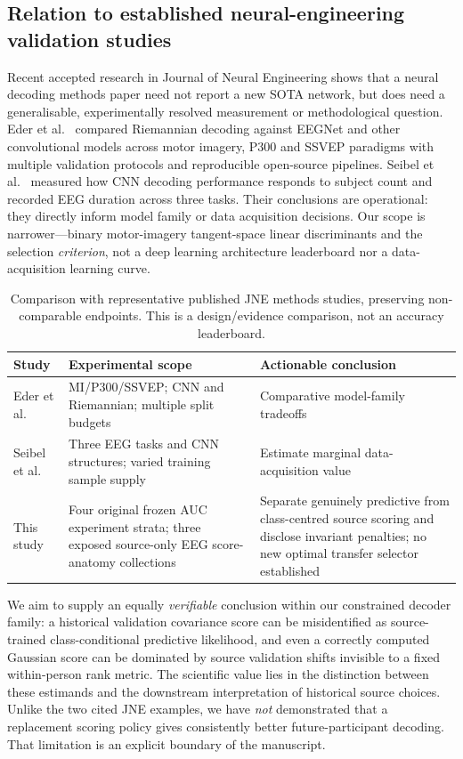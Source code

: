 \subsection{Relation to established neural-engineering validation studies}
\label{sec:p1-jne-peer}
Recent accepted research in Journal of Neural Engineering shows
that a neural decoding methods paper need not report a new SOTA
network, but does need a generalisable, experimentally resolved
measurement or methodological question.
Eder et al.\ \cite{eder2024jnebenchmark} compared Riemannian
decoding against EEGNet and other convolutional models
across motor imagery, P300 and SSVEP paradigms with multiple
validation protocols and reproducible open-source pipelines.
Seibel et al.\ \cite{seibel2026jnedata}
measured how CNN decoding performance responds to subject
count and recorded EEG duration across three tasks.
Their conclusions are operational: they directly inform
model family or data acquisition decisions.
Our scope is narrower---binary motor-imagery
tangent-space linear discriminants and the
selection \emph{criterion}, not a deep learning
architecture leaderboard nor a data-acquisition
learning curve.

\begin{table}[tb]
\centering\small
\caption{Comparison with representative published
JNE methods studies, preserving non-comparable
endpoints. This is a design/evidence comparison,
not an accuracy leaderboard.}
\label{tab:p1-jne-peer}
\setlength{\tabcolsep}{4pt}
\begin{tabular}{p{.24\linewidth}p{.31\linewidth}p{.33\linewidth}}
\toprule
Study & Experimental scope & Actionable conclusion\\
\midrule
Eder et al.\ \cite{eder2024jnebenchmark}
& MI/P300/SSVEP; CNN and Riemannian; multiple split budgets
& Comparative model-family tradeoffs\\
Seibel et al.\ \cite{seibel2026jnedata}
& Three EEG tasks and CNN structures; varied training sample supply
& Estimate marginal data-acquisition value\\
This study
& Four original frozen AUC experiment strata; three
  exposed source-only EEG score-anatomy collections
& Separate genuinely predictive from class-centred
  source scoring and disclose invariant penalties;
  no new optimal transfer selector established\\
\bottomrule
\end{tabular}
\end{table}

We aim to supply an equally \emph{verifiable} conclusion
within our constrained decoder family: a historical
validation covariance score can be misidentified as
source-trained class-conditional predictive likelihood,
and even a correctly computed Gaussian score can be
dominated by source validation shifts invisible to
a fixed within-person rank metric.
The scientific value lies in the distinction
between these estimands and the downstream
interpretation of historical source choices.
Unlike the two cited JNE examples, we have
\emph{not} demonstrated that a replacement
scoring policy gives consistently better
future-participant decoding. That limitation
is an explicit boundary of the manuscript.

